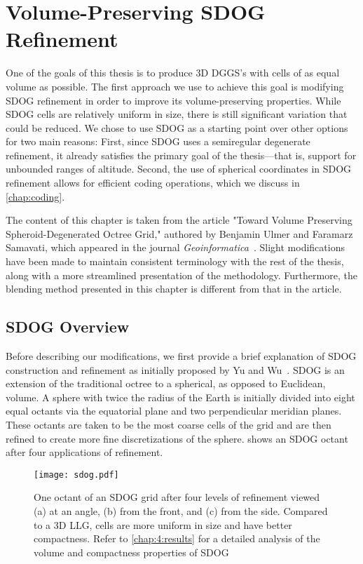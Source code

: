 \chapter{Volume-Preserving SDOG Refinement} \label{chap:sdog}
One of the goals of this thesis is to produce 3D DGGS's with cells of as equal volume as possible.
The first approach we use to achieve this goal is modifying SDOG refinement in order to improve its volume-preserving properties.
While SDOG cells are relatively uniform in size, there is still significant variation that could be reduced.
We chose to use SDOG as a starting point over other options for two main reasons:
First, since SDOG uses a semiregular degenerate refinement, it already satisfies the primary goal of the thesis---that is, support for unbounded ranges of altitude.
Second, the use of spherical coordinates in SDOG refinement allows for efficient coding operations, which we discuss in \cref{chap:coding}.


The content of this chapter is taken from the article "Toward Volume Preserving Spheroid-Degenerated Octree Grid," authored by Benjamin Ulmer and Faramarz Samavati, which appeared in the journal \textit{Geoinformatica}~\cite{ulmer2020toward}.
Slight modifications have been made to maintain consistent terminology with the rest of the thesis, along with a more streamlined presentation of the methodology. Furthermore, the blending method presented in this chapter is different from that in the article.


\section{SDOG Overview} \label{chap:4:sdog}
Before describing our modifications, we first provide a brief explanation of SDOG construction and refinement as initially proposed by Yu and Wu~\cite{yu2009sdog}.
SDOG is an extension of the traditional octree to a spherical, as opposed to Euclidean, volume.
A sphere with twice the radius of the Earth is initially divided into eight equal octants via the equatorial plane and two perpendicular meridian planes.
These octants are taken to be the most coarse cells of the grid and are then refined to create more fine discretizations of the sphere.
 shows an SDOG octant after four applications of refinement.


\begin{figure}[ht!]
	\centering
	\texttt{[image: sdog.pdf]}
	\caption[Different views of an SDOG octant]{
		One octant of an SDOG grid after four levels of refinement viewed (a) at an angle, (b) from the front, and (c) from the side.
		Compared to a 3D LLG, cells are more uniform in size and have better compactness.
		Refer to \cref{chap:4:results} for a detailed analysis of the volume and compactness properties of SDOG
	}
	\label{fig:sdog}
\end{figure}


